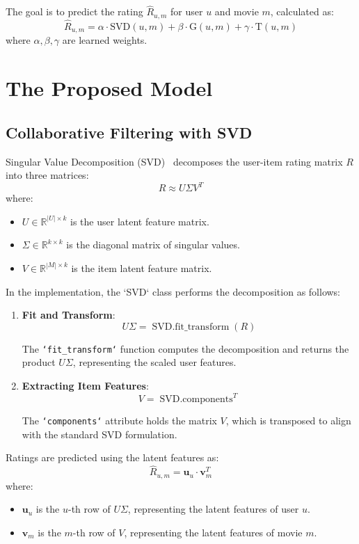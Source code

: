 \documentclass[nonacm, sigconf]{acmart}
\begin{document}
The goal is to predict the rating $\hat{R}_{u,m}$ for user $u$ and movie $m$, calculated as\cite{mmds}:
\[
\hat{R}_{u,m} = \alpha \cdot \text{SVD}(u, m) + \beta \cdot \text{G}(u, m) + \gamma \cdot \text{T}(u, m)
\]
where $\alpha, \beta, \gamma$ are learned weights.

\section{The Proposed Model}
\subsection{Collaborative Filtering with SVD}
Singular Value Decomposition (SVD)~\cite{scikit_truncated_svd_docs, scikit_truncated_svd_github} decomposes the user-item rating matrix $R$ into three matrices:
\[
R \approx U \Sigma V^T
\]
where:
\begin{itemize}
    \item $U \in \mathbb{R}^{|U| \times k}$ is the user latent feature matrix.
    \item $\Sigma \in \mathbb{R}^{k \times k}$ is the diagonal matrix of singular values.
    \item $V \in \mathbb{R}^{|M| \times k}$ is the item latent feature matrix.
\end{itemize}

In the implementation, the `SVD` class\cite{scikit_truncated_svd_github} performs the decomposition as follows:

\begin{enumerate}
    \item \textbf{Fit and Transform}:
    \[
    U\Sigma = \operatorname{SVD.fit\_transform}(R)
    \]
    
    The \texttt{`fit\_transform`} function computes the decomposition and returns the product $U\Sigma$, representing the scaled user features.

    \item \textbf{Extracting Item Features}:
    \[
    V = \operatorname{SVD.components}^T
    \]
    
    The \texttt{`components`} attribute holds the matrix $V$, which is transposed to align with the standard SVD formulation.
\end{enumerate}

Ratings are predicted using the latent features as:
\[
\hat{R}_{u,m} = \mathbf{u}_u \cdot \mathbf{v}_m^T
\]
where:
\begin{itemize}
    \item $\mathbf{u}_u$ is the $u$-th row of $U\Sigma$, representing the latent features of user $u$.
    \item $\mathbf{v}_m$ is the $m$-th row of $V$, representing the latent features of movie $m$.
\end{itemize}
\end{document}
